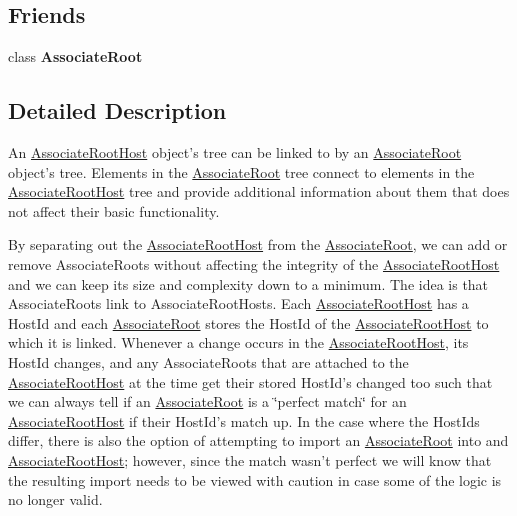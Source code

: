 \subsection*{Friends}
\begin{DoxyCompactItemize}
\item 
\hypertarget{class_picto_1_1_associate_root_host_a7b08add12992fe7e8e15cd8ed014e61d}{class {\bfseries Associate\-Root}}\label{class_picto_1_1_associate_root_host_a7b08add12992fe7e8e15cd8ed014e61d}

\end{DoxyCompactItemize}


\subsection{Detailed Description}
An \hyperlink{class_picto_1_1_associate_root_host}{Associate\-Root\-Host} object's tree can be linked to by an \hyperlink{class_picto_1_1_associate_root}{Associate\-Root} object's tree. Elements in the \hyperlink{class_picto_1_1_associate_root}{Associate\-Root} tree connect to elements in the \hyperlink{class_picto_1_1_associate_root_host}{Associate\-Root\-Host} tree and provide additional information about them that does not affect their basic functionality. 

By separating out the \hyperlink{class_picto_1_1_associate_root_host}{Associate\-Root\-Host} from the \hyperlink{class_picto_1_1_associate_root}{Associate\-Root}, we can add or remove Associate\-Roots without affecting the integrity of the \hyperlink{class_picto_1_1_associate_root_host}{Associate\-Root\-Host} and we can keep its size and complexity down to a minimum. The idea is that Associate\-Roots link to Associate\-Root\-Hosts. Each \hyperlink{class_picto_1_1_associate_root_host}{Associate\-Root\-Host} has a Host\-Id and each \hyperlink{class_picto_1_1_associate_root}{Associate\-Root} stores the Host\-Id of the \hyperlink{class_picto_1_1_associate_root_host}{Associate\-Root\-Host} to which it is linked. Whenever a change occurs in the \hyperlink{class_picto_1_1_associate_root_host}{Associate\-Root\-Host}, its Host\-Id changes, and any Associate\-Roots that are attached to the \hyperlink{class_picto_1_1_associate_root_host}{Associate\-Root\-Host} at the time get their stored Host\-Id's changed too such that we can always tell if an \hyperlink{class_picto_1_1_associate_root}{Associate\-Root} is a \char`\"{}perfect match\char`\"{} for an \hyperlink{class_picto_1_1_associate_root_host}{Associate\-Root\-Host} if their Host\-Id's match up. In the case where the Host\-Ids differ, there is also the option of attempting to import an \hyperlink{class_picto_1_1_associate_root}{Associate\-Root} into and \hyperlink{class_picto_1_1_associate_root_host}{Associate\-Root\-Host}; however, since the match wasn't perfect we will know that the resulting import needs to be viewed with caution in case some of the logic is no longer valid.

